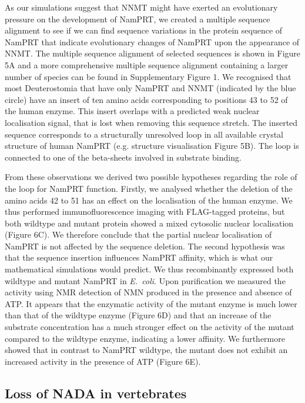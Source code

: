 As our simulations suggest that NNMT might have exerted an evolutionary pressure on the development of NamPRT, we created a multiple sequence alignment to see if we can find sequence variations in the protein sequence of NamPRT that indicate evolutionary changes of NamPRT upon the appearance of NNMT. The multiple sequence alignment of selected sequences is shown in Figure 5A and a more comprehensive multiple sequence alignment containing a larger number of species can be found in Supplementary Figure 1. We recognised that most Deuterostomia that have only NamPRT and NNMT (indicated by the blue circle) have an insert of ten amino acids corresponding to positions 43 to 52 of the human enzyme. This insert overlaps with a predicted weak nuclear localisation signal, that is lost when removing this sequence stretch. The inserted sequence corresponds to a structurally unresolved loop in all available crystal structure of human NamPRT (e.g. \cite{Wang2006} structure visualisation Figure 5B). The loop is connected to one of the beta-sheets involved in substrate binding.

From these observations we derived two possible hypotheses regarding the role of the loop for NamPRT function. Firstly, we analysed whether the deletion of the amino acids 42 to 51 has an effect on the localisation of the human enzyme. We thus performed immunofluorescence imaging with FLAG-tagged proteins, but both wildtype and mutant protein showed a mixed cytosolic nuclear localisation (Figure 6C). We therefore conclude that the partial nuclear localisation of NamPRT is not affected by the sequence deletion.
The second hypothesis was that the sequence insertion influences NamPRT affinity, which is what our mathematical simulations would predict. We thus recombinantly expressed both wildtype and mutant NamPRT in \textit{E.~coli}. Upon purification we measured the activity using NMR detection of NMN produced in the presence and absence of ATP. It appears that the enzymatic activity of the mutant enzyme is much lower than that of the wildtype enzyme (Figure 6D) and that an increase of the substrate concentration has a much stronger effect on the activity of the mutant compared to the wildtype enzyme, indicating a lower affinity. We furthermore showed that in contrast to NamPRT wildtype, the mutant does not exhibit an increased activity in the presence of ATP (Figure 6E).

\subsection{Loss of NADA in vertebrates}

